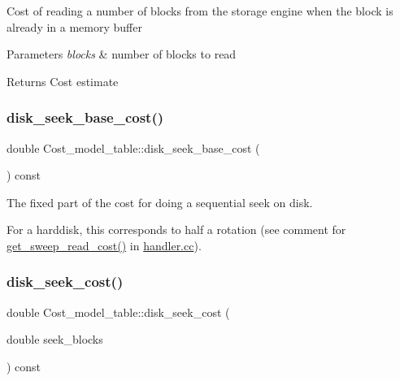 Cost of reading a number of blocks from the storage engine when the block is already in a memory buffer


\begin{DoxyParams}{Parameters}
{\em blocks} & number of blocks to read\\
\hline
\end{DoxyParams}
\begin{DoxyReturn}{Returns}
Cost estimate 
\end{DoxyReturn}
\mbox{\label{classCost__model__table_a5a45ab14ac40b5560c22acb0d25f7f01}} 
\subsubsection{\texorpdfstring{disk\+\_\+seek\+\_\+base\+\_\+cost()}{disk\_seek\_base\_cost()}}
{\footnotesize\ttfamily double Cost\+\_\+model\+\_\+table\+::disk\+\_\+seek\+\_\+base\+\_\+cost (\begin{DoxyParamCaption}{ }\end{DoxyParamCaption}) const\hspace{0.3cm}{\ttfamily [inline]}}

The fixed part of the cost for doing a sequential seek on disk.

For a harddisk, this corresponds to half a rotation (see comment for \mbox{\hyperlink{handler_8cc_a7d121a7b14ef956c0df32895a7a9a08b}{get\+\_\+sweep\+\_\+read\+\_\+cost()}} in \mbox{\hyperlink{handler_8cc}{handler.\+cc}}). \mbox{\label{classCost__model__table_ad36900f273faa51228c6bf1f7fb3c3d6}} 
\subsubsection{\texorpdfstring{disk\+\_\+seek\+\_\+cost()}{disk\_seek\_cost()}}
{\footnotesize\ttfamily double Cost\+\_\+model\+\_\+table\+::disk\+\_\+seek\+\_\+cost (\begin{DoxyParamCaption}\item[{double}]{seek\+\_\+blocks }\end{DoxyParamCaption}) const\hspace{0.3cm}{\ttfamily [inline]}}

